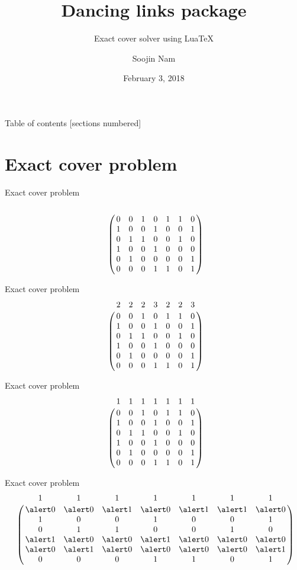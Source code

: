 \documentclass[xcolor=svgnames]{beamer}
\title{Dancing links package}
\subtitle{Exact cover solver using Lua\TeX }
\date{February 3, 2018}
\author{Soojin Nam}
\institute{The Korean \TeX\ Society}
\begin{document}
\maketitle

%
\begin{frame}{Table of contents}
  [sections numbered]
  \tableofcontents
\end{frame}


\section{Exact cover problem}

\let\a\alert
%
\begin{frame}{Exact cover problem}
\Large\boldmath
$$
\bordermatrix{
  \strut&&&&&&&\cr
  &0&0&1&0&1&1&0\cr
  &1&0&0&1&0&0&1\cr
  &0&1&1&0&0&1&0\cr
  &1&0&0&1&0&0&0\cr
  &0&1&0&0&0&0&1\cr
  &0&0&0&1&1&0&1}
$$
\end{frame}

%
\begin{frame}{Exact cover problem}
\Large\boldmath
$$
\bordermatrix{
  &2&2&2&3&2&2&3\cr
  &0&0&1&0&1&1&0\cr
  &1&0&0&1&0&0&1\cr
  &0&1&1&0&0&1&0\cr
  &1&0&0&1&0&0&0\cr
  &0&1&0&0&0&0&1\cr
  &0&0&0&1&1&0&1}
$$
\end{frame}

%
\begin{frame}{Exact cover problem}
\Large\boldmath
$$
\bordermatrix{
  &1&1&1&1&1&1&1\cr
  &0&0&1&0&1&1&0\cr
  &1&0&0&1&0&0&1\cr
  &0&1&1&0&0&1&0\cr
  &1&0&0&1&0&0&0\cr
  &0&1&0&0&0&0&1\cr
  &0&0&0&1&1&0&1}
$$
\end{frame}

%
\begin{frame}{Exact cover problem}
\Large\boldmath
$$
\bordermatrix{
  &1&1&1&1&1&1&1\cr
  &\a0&\a0&\a1&\a0&\a1&\a1&\a0\cr
  &1&0&0&1&0&0&1\cr
  &0&1&1&0&0&1&0\cr
  &\a1&\a0&\a0&\a1&\a0&\a0&\a0\cr
  &\a0&\a1&\a0&\a0&\a0&\a0&\a1\cr
  &0&0&0&1&1&0&1}
$$
\end{frame}
\end{document}
